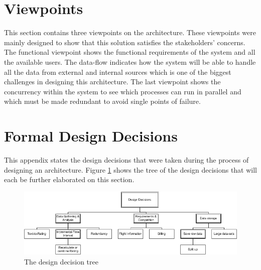 \documentclass{article}
\begin{document}


\section{Viewpoints}
\label{sec:viewpoints}
This section contains three viewpoints on the architecture. These viewpoints were mainly designed to show that this solution satisfies the stakeholders' concerns. The functional viewpoint shows the functional requirements of the system and all the available users. The data-flow indicates how the system will be able to handle all the data from external and internal sources which is one of the biggest challenges in designing this architecture. The last viewpoint shows the concurrency within the system to see which processes can run in parallel and which must be made redundant to avoid single points of failure.


%



\appendix
\clearpage

\label{sec:requirements}

\clearpage
\section{Formal Design Decisions}
\label{sec:designdecisions}
This appendix states the design decisions that were taken during the process of designing an architecture. Figure \ref{fig:ddtree} shows the tree of the design decisions that will each be further elaborated on this section.

\begin{figure}[!ht]
\includegraphics[width= 470px]{DDTree}
\caption{The design decision tree}
\label{fig:ddtree}
\end{figure}

\setcounter{table}{0}

\clearpage

\newpage

%
\newpage

%
\newpage

\newpage

\newpage

\newpage

\newpage

\newpage

\newpage

\end{document}
